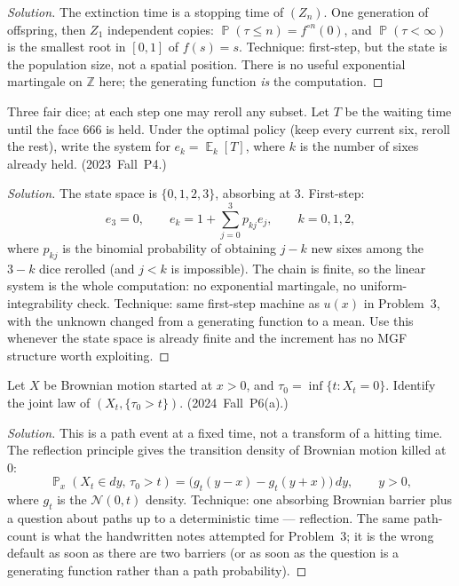 \documentclass[11pt,a4paper]{article}
\DeclareMathOperator{\E}{\mathbb{E}}
\DeclareMathOperator{\Pbb}{\mathbb{P}}
\begin{document}
\begin{proof}[Solution]
The extinction time is a stopping time of \( (Z_n) \). One generation of offspring, then \( Z_1 \) independent copies: \( \Pbb(\tau\le n)=f^{\circ n}(0) \), and \( \Pbb(\tau<\infty) \) is the smallest root in \( [0,1] \) of \( f(s)=s \). Technique: first-step, but the state is the population size, not a spatial position. There is no useful exponential martingale on \( \mathbb{Z} \) here; the generating function \emph{is} the computation.
\end{proof}

\begin{example}
\label{ex:stop-finite-chain}
Three fair dice; at each step one may reroll any subset. Let \( T \) be the waiting time until the face \( 666 \) is held. Under the optimal policy (keep every current six, reroll the rest), write the system for \( e_k=\E_k[T] \), where \( k \) is the number of sixes already held. (2023~Fall~P4.)
\end{example}

\begin{proof}[Solution]
The state space is \( \{0,1,2,3\} \), absorbing at \( 3 \). First-step:
\[
e_3=0,
\qquad
e_k
=
1+\sum_{j=0}^{3}p_{kj}e_j,
\qquad
k=0,1,2,
\]
where \( p_{kj} \) is the binomial probability of obtaining \( j-k \) new sixes among the \( 3-k \) dice rerolled (and \( j<k \) is impossible). The chain is finite, so the linear system is the whole computation: no exponential martingale, no uniform-integrability check. Technique: same first-step machine as \( u(x) \) in Problem~3, with the unknown changed from a generating function to a mean. Use this whenever the state space is already finite and the increment has no MGF structure worth exploiting.
\end{proof}

\begin{example}
\label{ex:stop-reflection}
Let \( X \) be Brownian motion started at \( x>0 \), and \( \tau_0=\inf\{t:X_t=0\} \). Identify the joint law of \( (X_t,\{\tau_0>t\}) \). (2024~Fall~P6(a).)
\end{example}

\begin{proof}[Solution]
This is a path event at a fixed time, not a transform of a hitting time. The reflection principle gives the transition density of Brownian motion killed at \( 0 \):
\[
\Pbb_x(X_t\in dy,\,\tau_0>t)
=
\bigl(g_t(y-x)-g_t(y+x)\bigr)\,dy,
\qquad
y>0,
\]
where \( g_t \) is the \( \mathcal{N}(0,t) \) density. Technique: one absorbing Brownian barrier plus a question about paths up to a deterministic time --- reflection. The same path-count is what the handwritten notes attempted for Problem~3; it is the wrong default as soon as there are two barriers (or as soon as the question is a generating function rather than a path probability).
\end{proof}
\end{document}
